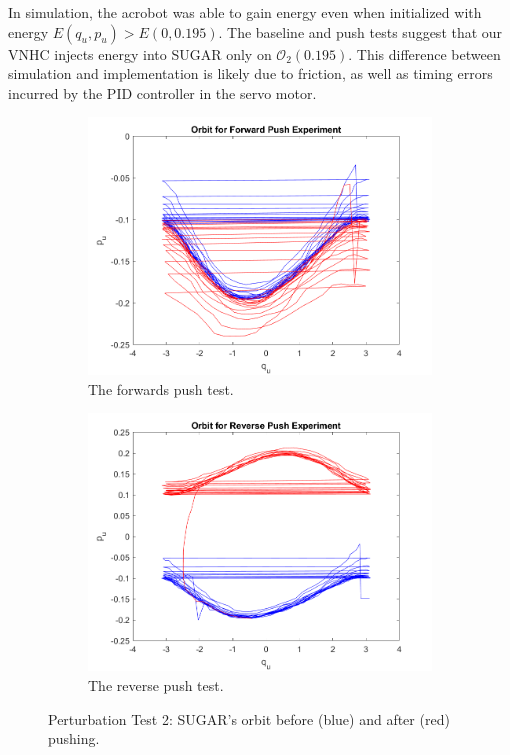 \documentclass[journal,twoside,onecolumn,draftclsnofoot,web]{ieeecolor}
\begin{document}
{In simulation, the acrobot was able to gain energy even when initialized
with energy \(E(q_u,p_u) > E(0,0.195)\). 
The baseline and push tests suggest that our VNHC injects energy into SUGAR
only on \(\mathcal{O}_2(0.195)\).
This difference between simulation and implementation is likely due to
friction, as well as timing errors incurred by the PID controller in the servo
motor.

\begin{figure}
    \centering
    \begin{subfigure}[ht]{0.49\linewidth}
        \includegraphics[width=\linewidth]{acrobot_fpush_orbit.png}
        \caption{The forwards push test.}
        \label{fig:acrobot-fpush-orbit}
    \end{subfigure}
    \begin{subfigure}[ht]{0.49\linewidth}
        \includegraphics[width=\linewidth]{acrobot_rpush_orbit.png}
        \caption{The reverse push test.}
        \label{fig:acrobot-rpush-orbit}
    \end{subfigure}
    \caption{Perturbation Test 2: SUGAR's orbit before (blue) and after (red) pushing.}
\end{figure}

}
\end{document}

